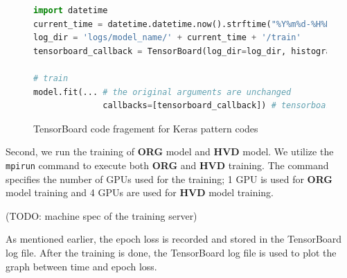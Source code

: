 \begin{figure}[!ht]
  \begin{lstlisting}[language=Python]
import datetime
current_time = datetime.datetime.now().strftime("%Y%m%d-%H%M%S")
log_dir = 'logs/model_name/' + current_time + '/train'
tensorboard_callback = TensorBoard(log_dir=log_dir, histogram_freq=1)

# train
model.fit(... # the original arguments are unchanged
              callbacks=[tensorboard_callback]) # tensorboard_callback is added
  \end{lstlisting}
  \caption{TensorBoard code fragement for Keras pattern codes}
\end{figure}

Second, we run the training of \textbf{ORG} model and
\textbf{HVD} model. We utilize the {\tt mpirun} command to execute both
\textbf{ORG} and \textbf{HVD} training. The command specifies the number of
GPUs used for the training; 1 GPU is used for \textbf{ORG} model training  
and 4 GPUs are used for \textbf{HVD} model training. 

(TODO: machine spec of the training server)

As mentioned earlier, the epoch loss is recorded and stored in the
TensorBoard log file.
After the training is done, the TensorBoard log file is used to plot the
graph between time and epoch loss. 

